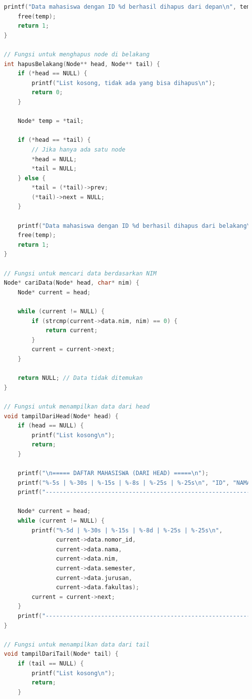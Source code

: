 \documentclass{article}
\begin{document}
\begin{lstlisting}[language=C, caption={Program Double Linked List},
  label={lst:sample-c-code}, basicstyle=\ttfamily\footnotesize,
  keywordstyle=\color{blue}, commentstyle=\color{green},
  stringstyle=\color{red}]
    printf("Data mahasiswa dengan ID %d berhasil dihapus dari depan\n", temp->data.nomor_id);
    free(temp);
    return 1;
}

// Fungsi untuk menghapus node di belakang
int hapusBelakang(Node** head, Node** tail) {
    if (*head == NULL) {
        printf("List kosong, tidak ada yang bisa dihapus\n");
        return 0;
    }
    
    Node* temp = *tail;
    
    if (*head == *tail) {
        // Jika hanya ada satu node
        *head = NULL;
        *tail = NULL;
    } else {
        *tail = (*tail)->prev;
        (*tail)->next = NULL;
    }
    
    printf("Data mahasiswa dengan ID %d berhasil dihapus dari belakang\n", temp->data.nomor_id);
    free(temp);
    return 1;
}

// Fungsi untuk mencari data berdasarkan NIM
Node* cariData(Node* head, char* nim) {
    Node* current = head;
    
    while (current != NULL) {
        if (strcmp(current->data.nim, nim) == 0) {
            return current;
        }
        current = current->next;
    }
    
    return NULL; // Data tidak ditemukan
}

// Fungsi untuk menampilkan data dari head
void tampilDariHead(Node* head) {
    if (head == NULL) {
        printf("List kosong\n");
        return;
    }
    
    printf("\n===== DAFTAR MAHASISWA (DARI HEAD) =====\n");
    printf("%-5s | %-30s | %-15s | %-8s | %-25s | %-25s\n", "ID", "NAMA", "NIM", "SEMESTER", "JURUSAN", "FAKULTAS");
    printf("--------------------------------------------------------------------------------------------------------\n");
    
    Node* current = head;
    while (current != NULL) {
        printf("%-5d | %-30s | %-15s | %-8d | %-25s | %-25s\n",
               current->data.nomor_id,
               current->data.nama,
               current->data.nim,
               current->data.semester,
               current->data.jurusan,
               current->data.fakultas);
        current = current->next;
    }
    printf("--------------------------------------------------------------------------------------------------------\n");
}

// Fungsi untuk menampilkan data dari tail
void tampilDariTail(Node* tail) {
    if (tail == NULL) {
        printf("List kosong\n");
        return;
    }
    

\end{lstlisting}
\end{document}

